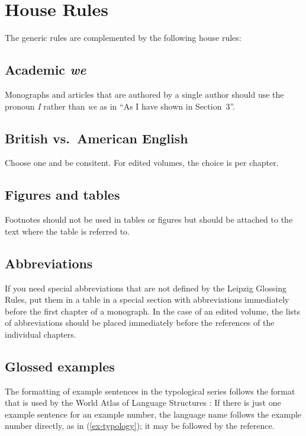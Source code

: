 \section{House Rules}
The generic rules are complemented by the following house rules:

\subsection{Academic \emph{we}}

Monographs and articles that are authored by a single author should use the pronoun \emph{I} rather
than \emph{we} as in ``As I have shown in Section~3''.	
 

\subsection{British vs.\ American English}
Choose one and be consitent. For edited volumes, the choice is per chapter.  


\subsection{Figures and tables} 
Footnotes should not be used in tables or figures but should be attached to the text where the table is referred to.



\subsection{Abbreviations}
If you need special abbreviations that are not defined by the Leipzig Glossing Rules, put them in a table in a special section with abbreviations immediately before the first chapter of a monograph. In the case of an edited volume, the lists of abbreviations should be placed immediately before the references of the individual chapters.

\subsection{Glossed examples}
The formatting of example sentences in the typological series follows the format that is used by the World Atlas of Language Structures \citep{WALS}: If there is just one example sentence for an example number, the language name follows the example number directly, as in (\ref{ex-typology}); it may be followed by the reference.

